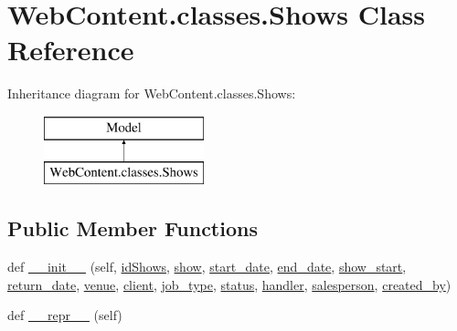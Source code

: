 \hypertarget{class_web_content_1_1classes_1_1_shows}{}\section{Web\+Content.\+classes.\+Shows Class Reference}
\label{class_web_content_1_1classes_1_1_shows}
Inheritance diagram for Web\+Content.\+classes.\+Shows\+:\begin{figure}[H]
\begin{center}
\leavevmode
\includegraphics[height=2.000000cm]{class_web_content_1_1classes_1_1_shows}
\end{center}
\end{figure}
\subsection*{Public Member Functions}
\begin{DoxyCompactItemize}
\item 
def \hyperlink{class_web_content_1_1classes_1_1_shows_aa08b1c685aa53cfa043340f94e63905e}{\+\_\+\+\_\+init\+\_\+\+\_\+} (self, \hyperlink{class_web_content_1_1classes_1_1_shows_a9ed1265f6e8a1078de474691f846f793}{id\+Shows}, \hyperlink{class_web_content_1_1classes_1_1_shows_aec2efee9bcdad6b3a4732d6327d7f25c}{show}, \hyperlink{class_web_content_1_1classes_1_1_shows_a6c17ca935d1ab7bce12c2ad5a55bfd0e}{start\+\_\+date}, \hyperlink{class_web_content_1_1classes_1_1_shows_a8e22ab3d1b30b350f3464bcd61b3ab8a}{end\+\_\+date}, \hyperlink{class_web_content_1_1classes_1_1_shows_ad70665816e2050b3176e90e95655f3fb}{show\+\_\+start}, \hyperlink{class_web_content_1_1classes_1_1_shows_aee5eee42b3d279a14f401c113d79083c}{return\+\_\+date}, \hyperlink{class_web_content_1_1classes_1_1_shows_ac931bd921ecb35a0e221ff9133162d2c}{venue}, \hyperlink{class_web_content_1_1classes_1_1_shows_ad95c8895e4633584f7da017e2b79f45d}{client}, \hyperlink{class_web_content_1_1classes_1_1_shows_ae5f65ed709a0218f1298610e91500719}{job\+\_\+type}, \hyperlink{class_web_content_1_1classes_1_1_shows_ae116171a1ecb47ad43e5631115fe9f43}{status}, \hyperlink{class_web_content_1_1classes_1_1_shows_a23219663a5b011841e8054fc6ca88e0f}{handler}, \hyperlink{class_web_content_1_1classes_1_1_shows_a59168ff70138cf3bafb49d58bc7e4cbe}{salesperson}, \hyperlink{class_web_content_1_1classes_1_1_shows_a1c11f5ef467e4230b4672c40cd7268fe}{created\+\_\+by})
\item 
def \hyperlink{class_web_content_1_1classes_1_1_shows_a6691b87ec53fa9349d04a41317fd1bee}{\+\_\+\+\_\+repr\+\_\+\+\_\+} (self)
\end{DoxyCompactItemize}
